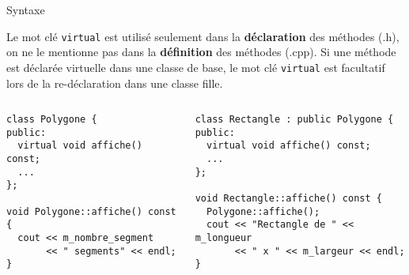 \documentclass[c]{beamer}
\begin{document}
\begin{frame}[fragile]{Syntaxe}
\begin{center}
Le mot clé \texttt{virtual} est utilisé seulement dans la \textbf{déclaration} des méthodes (.h), on ne le mentionne pas dans la \textbf{définition} des méthodes (.cpp). Si une méthode est déclarée virtuelle dans une classe de base, le mot clé \texttt{virtual} est facultatif lors de la re-déclaration dans une classe fille. 
\end{center}

\begin{columns}
\begin{column}{0.5\columnwidth}
\begin{verbatim}
class Polygone {
public:
  virtual void affiche() const;
  ...
};

void Polygone::affiche() const {
  cout << m_nombre_segment
       << " segments" << endl;
}
\end{verbatim}
\end{column}

\begin{column}{0.65\columnwidth}
\begin{verbatim}
class Rectangle : public Polygone {
public:
  virtual void affiche() const;
  ...
};

void Rectangle::affiche() const {
  Polygone::affiche();
  cout << "Rectangle de " << m_longueur
       << " x " << m_largeur << endl;
}
\end{verbatim}

\end{column}
\end{columns}

\pause
{}

\pause
{}

\end{frame}
\end{document}
